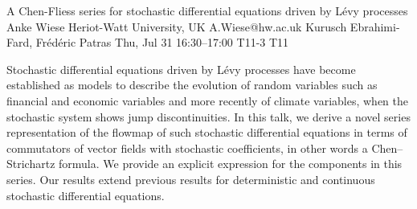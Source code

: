 \documentclass[12pt,lettersize,oneside]{book} %
\begin{document}
\begin{talk}
  {A Chen-Fliess series for stochastic differential equations driven by L{\'e}vy processes}%
  {Anke Wiese}%
  {Heriot-Watt University, UK}%
  {A.Wiese@hw.ac.uk}%
  {Kurusch Ebrahimi-Fard, Fr{\'e}d{\'e}ric Patras}%
  {}%
  {Thu, Jul 31 16:30--17:00}%
  {T11-3}%
  {T11}%
  
    

Stochastic differential equations driven by L{\'e}vy processes have become established as models to describe the evolution of random variables such as financial and economic variables and more recently of climate variables, when the stochastic system shows jump discontinuities. In this talk, we derive a novel series representation of the flowmap of such stochastic 
differential equations 
in terms of commutators of vector fields with stochastic 
coefficients, in other words a Chen--Strichartz formula. We provide an explicit expression for the components in this series. 
Our results extend previous results
for deterministic and continuous stochastic differential equations.  
\end{talk}
\end{document}
